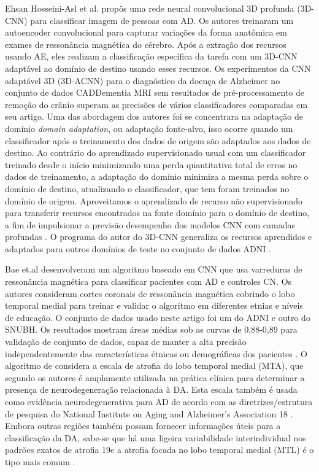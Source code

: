 \documentclass[openright]{UFRGS} %
\begin{document}
Ehsan Hosseini-Asl et al. propôs uma rede neural convolucional 3D profunda (3D-CNN) para classificar imagem de pessoas com AD. Os autores treinaram um autoencoder convolucional para capturar variações da forma anatômica em exames de ressonância magnética do cérebro. Após a extração dos recursos usando AE, eles realizam a classificação específica da tarefa com um 3D-CNN adaptável ao domínio de destino usando esses recursos. Os experimentos da CNN adaptável 3D (3D-ACNN) para o diagnóstico da doença de Alzheimer no conjunto de dados CADDementia MRI sem resultados de pré-processamento de remoção do crânio superam as precisões de vários classificadores comparadas em seu artigo.
Uma das abordagem dos autores foi se concentrara na adaptação de domínio  \textit{ domain adaptation}, ou adaptação
fonte-alvo, isso ocorre quando um classificador após o treinamento dos dados de origem são adaptados 
aos dados de destino.
Ao contrário do aprendizado supervisionado usual com um classificador treinado desde o início
minimizando uma perda quantitativa total de erros no
dados de treinamento, a adaptação do domínio minimiza a mesma perda
sobre o domínio de destino, atualizando o classificador, que tem
foram treinados no domínio de origem. Aproveitamos o aprendizado de recurso 
não supervisionado para transferir recursos encontrados na fonte
domínio para o domínio de destino, a fim de impulsionar a previsão
desempenho dos modelos CNN com camadas profundas \cite{hosseini2016alzheimer}. O programa do autor do 3D-CNN generaliza os recursos aprendidos e adaptados para outros domínios de teste no conjunto de dados ADNI \cite{hosseini2016alzheimer}.



Bae et.al desenvolveram um algoritmo baseado em CNN que usa varreduras de ressonância magnética para classificar pacientes com AD e controles CN. Os autores consideram cortes coronais de ressonância magnética cobrindo o lobo temporal medial para treinar e validar o algoritmo em diferentes etnias e níveis de educação. O conjunto de dados usado neste artigo foi um do ADNI e outro do SNUBH. Os resultados mostram áreas médias sob as curvas de 0,88-0,89 para validação de conjunto de dados, capaz de manter a alta precisão independentemente das características étnicas ou demográficas dos pacientes \cite{bae2020identification}. O algoritmo de  \cite{bae2020identification} considera a escala de atrofia do lobo 
temporal medial (MTA), que segundo os autores é amplamente utilizada na 
prática clínica para determinar a presença de neurodegeneração 
relacionada à DA. Esta escala também é usada como evidência neurodegenerativa para AD de acordo com as diretrizes/estrutura de pesquisa do National 
Institute on Aging and Alzheimer's Association 18 . 
Embora outras regiões também possam fornecer informações 
úteis para a classificação da DA, sabe-se que há uma ligeira
variabilidade interindividual nos padrões exatos de atrofia 19e 
a atrofia focada no 
lobo temporal medial (MTL) é o tipo mais comum \cite{bae2020identification}.
\end{document}
